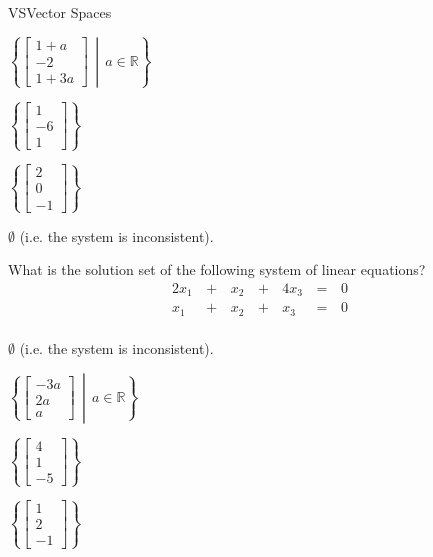 \documentclass{article}
\newcommand{\IR}{\mathbb{R}}
\newcommand{\setBuilder}[2]{\left\{#1\,\middle|\,#2\right\}}
\begin{document}
\begin{module}{VS}{Vector Spaces}
\begin{readinessAssuranceTest}
\begin{multicols}{4}
\begin{readinessAssuranceTestChoices}
  \item \(
          \setBuilder{ 
          \begin{bmatrix}
            1 +a\\ -2 \\ 1+3a
          \end{bmatrix}}{a \in \IR}
        \) 
  \item \(
          \left\{ \begin{bmatrix}
            1 \\ -6 \\ 1
          \end{bmatrix} \right\}
        \)
  \item \(
          \left\{ \begin{bmatrix}
            2 \\ 0 \\ -1
          \end{bmatrix} \right\}
        \) %
          \item \(\emptyset \) (i.e. the system is inconsistent).
  \end{readinessAssuranceTestChoices}
  \end{multicols}

  \item What is the solution set of the following system of linear equations?
  \begin{alignat*}{4}
    2x_1 &\,+\,& x_2 &\,+\,& 4x_3 &\,=\,& 0 \\
     x_1 &\,+\,& x_2 &\,+\,&  x_3 &\,=\,& 0 \\
  \end{alignat*}

  \begin{multicols}{4}
  \begin{readinessAssuranceTestChoices}
  \item \(\emptyset \) (i.e. the system is inconsistent).
  \item \(
         \setBuilder{ 
          \begin{bmatrix}
            -3a \\ 2a \\ a
          \end{bmatrix}}{a \in \IR}
        \)  %
  \item \(
          \left\{ \begin{bmatrix}
            4 \\ 1 \\ -5
          \end{bmatrix} \right\}
        \)
  \item \(
          \left\{\begin{bmatrix}
            1 \\ 2 \\ -1
          \end{bmatrix}\right\}
        \)
  \end{readinessAssuranceTestChoices}
  \end{multicols}



\end{readinessAssuranceTest}
\end{module}
\end{document}
